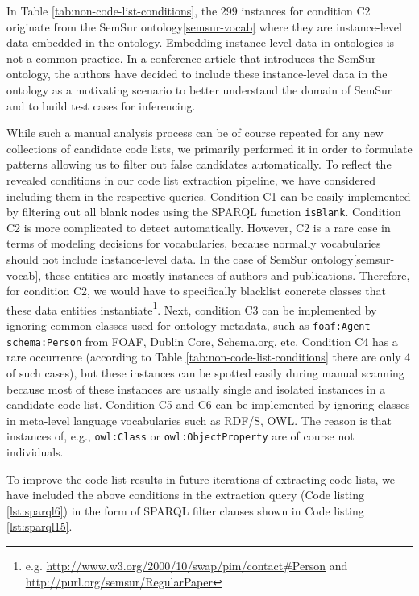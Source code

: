In Table \ref{tab:non-code-list-conditions}, the 299 instances for condition C2 originate from the SemSur ontology\cref{semsur-vocab} where they are instance-level data embedded in the ontology. Embedding instance-level data in ontologies is not a common practice. In a conference article \cite{DBLP:conf/i-semantics/FathallaVA018} that introduces the SemSur ontology, the authors have decided to include these instance-level data in the ontology as a motivating scenario to better understand the domain of SemSur and to build test cases for inferencing.

While such a manual analysis process can be of course repeated for any new collections of candidate code lists, we primarily performed it in order to formulate patterns allowing us to filter out false candidates automatically.
To reflect the revealed conditions in our code list extraction pipeline, we have considered including them in the respective queries. Condition C1 can be easily implemented by filtering out all blank nodes using the SPARQL function \texttt{isBlank}. Condition C2 is more complicated to detect automatically. However, C2 is a rare case in terms of modeling decisions for vocabularies, because normally vocabularies should not include instance-level data. In the case of SemSur ontology\cref{semsur-vocab}, these entities are mostly instances of authors and publications. Therefore, for condition C2, we would have to specifically blacklist concrete classes that these data entities instantiate\footnote{e.g. \url{http://www.w3.org/2000/10/swap/pim/contact\#Person} and \url{http://purl.org/semsur/RegularPaper}}. Next, condition C3 can be implemented by ignoring common classes used for ontology metadata, such as \texttt{foaf:Agent} \texttt{schema:Person} from FOAF, Dublin Core, Schema.org, etc. Condition C4 has a rare occurrence (according to Table \ref{tab:non-code-list-conditions} there are only 4 of such cases), but these instances can be spotted easily during manual scanning because most of these instances are usually single and isolated instances in a candidate code list. Condition C5 and C6 can be implemented by ignoring classes in meta-level language vocabularies such as RDF/S, OWL. The reason is that instances of, e.g., \texttt{owl:Class} or \texttt{owl:ObjectProperty} are of course not individuals. %

To improve the code list results in future iterations of extracting code lists, we have included the above conditions in the extraction query (Code listing \ref{lst:sparql6}) in the form of SPARQL filter clauses shown in Code listing \ref{lst:sparql15}.

